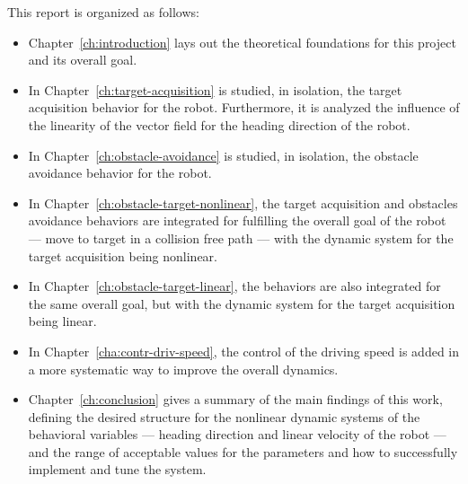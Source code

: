 This report is organized as follows:
\begin{itemize}
\item Chapter~\ref{ch:introduction} lays out the theoretical foundations for
  this project and its overall goal.
\item In Chapter~\ref{ch:target-acquisition} is studied, in isolation, the
  target acquisition behavior for the robot. Furthermore, it is analyzed the
  influence of the linearity of the vector field for the heading direction of
  the robot.
\item In Chapter~\ref{ch:obstacle-avoidance} is studied, in isolation, the
  obstacle avoidance behavior for the robot.
\item In Chapter~\ref{ch:obstacle-target-nonlinear}, the target acquisition and
  obstacles avoidance behaviors are integrated for fulfilling the overall goal
  of the robot --- move to target in a collision free path --- with the dynamic
  system for the target acquisition being nonlinear.
\item In Chapter~\ref{ch:obstacle-target-linear}, the behaviors are also
  integrated for the same overall goal, but with the dynamic system for the
  target acquisition being linear.
\item In Chapter~\ref{cha:contr-driv-speed}, the control of the driving speed is
  added in a more systematic way to improve the overall dynamics.
\item Chapter~\ref{ch:conclusion} gives a summary of the main findings of this
  work, defining the desired structure for the nonlinear dynamic systems of the
  behavioral variables --- heading direction and linear velocity of the robot
  --- and the range of acceptable values for the parameters and how to
  successfully implement and tune the system.
\end{itemize}
%
